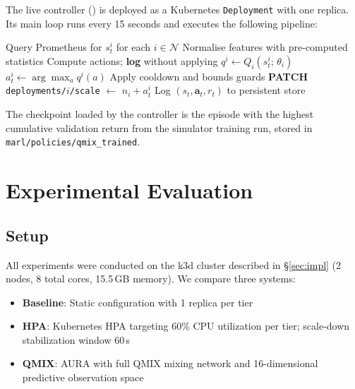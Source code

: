 \documentclass[conference]{IEEEtran}
\begin{document}
The live controller () is
deployed as a Kubernetes \texttt{Deployment} with one replica.
Its main loop runs every 15 seconds and executes the following
pipeline:

\begin{algorithm}[H]
\caption{AURA Control Loop (single tick)}
\label{alg:ctrl}
\begin{algorithmic}[1]
  \STATE Query Prometheus for $s_t^i$ for each $i \in \mathcal{N}$
  \STATE Normalise features with pre-computed statistics
    \STATE Compute actions; \textbf{log} without applying
  \ELSE
      \STATE $q^i \leftarrow Q_i(s_t^i;\,\theta_i)$
      \STATE $a_t^i \leftarrow \arg\max_{a} q^i(a)$
      \STATE Apply cooldown and bounds guards
      \STATE \textbf{PATCH} \texttt{deployments/$i$/scale}
             $\leftarrow$ $n_i + a_t^i$
    \ENDFOR
  \ENDIF
  \STATE Log $(s_t, \mathbf{a}_t, r_t)$ to persistent store
\end{algorithmic}
\end{algorithm}

The checkpoint loaded by the controller is the episode with the
highest cumulative validation return from the simulator training
run, stored in \texttt{marl/policies/qmix\_trained}.

\section{Experimental Evaluation}
\label{sec:eval}

\subsection{Setup}

All experiments were conducted on the k3d cluster described in
\S\ref{sec:impl} (2 nodes, 8 total cores, 15.5\,GB memory). We compare
three systems:
\begin{itemize}
  \item \textbf{Baseline}: Static configuration with 1 replica per tier
  \item \textbf{HPA}: Kubernetes HPA targeting 60\% CPU utilization
        per tier; scale-down stabilization window 60\,s
  \item \textbf{QMIX}: AURA with full QMIX mixing network and
        16-dimensional predictive observation space
\end{itemize}
\end{document}
